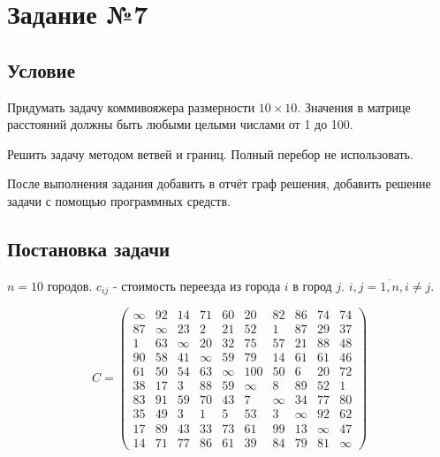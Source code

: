 \section{Задание №7}\label{07-lab}

\subsection{Условие}\label{07-lab-condition}

Придумать задачу коммивояжера размерности $10 \times 10$. Значения в матрице расстояний должны быть любыми целыми числами от 1 до 100.

Решить задачу методом ветвей и границ. Полный перебор не использовать.

После выполнения задания добавить в отчёт граф решения, добавить решение задачи с помощью программных средств.

\subsection{Постановка задачи}\label{07-lab-statement}

$n = 10$ городов. $c_{ij}$ - стоимость переезда из города $i$ в город $j$. $i, j = \overline{1, n}, i \neq j$.


\[
        C = \begin{pmatrix}
                \infty & 92     & 14     & 71     & 60     & 20     & 82     & 86     & 74     & 74     \\
                87     & \infty & 23     & 2      & 21     & 52     & 1      & 87     & 29     & 37     \\
                1      & 63     & \infty & 20     & 32     & 75     & 57     & 21     & 88     & 48     \\
                90     & 58     & 41     & \infty & 59     & 79     & 14     & 61     & 61     & 46     \\
                61     & 50     & 54     & 63     & \infty & 100    & 50     & 6      & 20     & 72     \\
                38     & 17     & 3      & 88     & 59     & \infty & 8      & 89     & 52     & 1      \\
                83     & 91     & 59     & 70     & 43     & 7      & \infty & 34     & 77     & 80     \\
                35     & 49     & 3      & 1      & 5      & 53     & 3      & \infty & 92     & 62     \\
                17     & 89     & 43     & 33     & 73     & 61     & 99     & 13     & \infty & 47     \\
                14     & 71     & 77     & 86     & 61     & 39     & 84     & 79     & 81     & \infty
        \end{pmatrix}
\]


